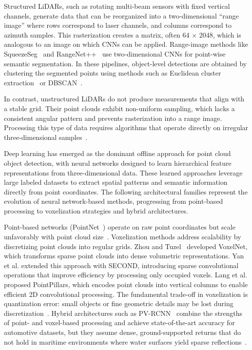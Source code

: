 \documentclass{erauthesis}
\begin{document}
Structured LiDARs, such as rotating multi-beam sensors with fixed vertical channels, generate data that can be reorganized into a two-dimensional “range image” where rows correspond to laser channels, and columns correspond to azimuth samples. This rasterization creates a matrix, often 64 $\times$ 2048, which is analogous to an image on which \acp{CNN} can be applied. 
Range-image methods like SqueezeSeg~\cite{wu2018} and RangeNet++~\cite{milioto2019} use two-dimensional \acp{CNN} for point-wise semantic segmentation. In these pipelines, object-level detections are obtained by clustering the segmented points using methods such as Euclidean cluster extraction~\cite{rusu2011} or DBSCAN~\cite{Ester1996}.

In contrast, unstructured LiDARs do not produce measurements that align with a stable grid. Their point clouds exhibit non-uniform sampling, which lacks a consistent angular pattern and prevents rasterization into a range image. 
Processing this type of data requires algorithms that operate directly on irregular three-dimensional samples~\cite{zhou2018, shi2019}.

Deep learning has emerged as the dominant offline approach for point cloud object detection, with neural networks designed to learn hierarchical feature representations from three-dimensional data. These learned approaches leverage large labeled datasets to extract spatial patterns and semantic information directly from point coordinates. The following architectural families represent the evolution of neural network-based methods, progressing from point-based processing to voxelization strategies and hybrid architectures.

Point-based networks (PointNet~\cite{qi2017}) operate on raw point coordinates but scale unfavorably with point cloud size~\cite{shi2019}. Voxelization methods address scalability by discretizing point clouds into regular grids. Zhou and Tuzel~\cite{zhou2018} developed VoxelNet, which transforms sparse point clouds into dense volumetric representations. Yan et al.\cite{yan2018} extended this approach with SECOND, introducing sparse convolutional operations that improve efficiency by processing only occupied voxels. Lang et al.\cite{lang2019} proposed PointPillars, which encodes point clouds into vertical columns to enable efficient 2D convolutional processing. The fundamental trade-off in voxelization is quantization error: small objects or fine geometric details may be lost during discretization~\cite{zhou2018}. Hybrid architectures such as PV-RCNN~\cite{shi2021} combine the strengths of point- and voxel-based processing and achieve state-of-the-art accuracy for automotive datasets, but they assume dense, ground-supported returns that do not hold in maritime environments where water surfaces yield sparse reflections~\cite{kunz2005}.
\end{document}
